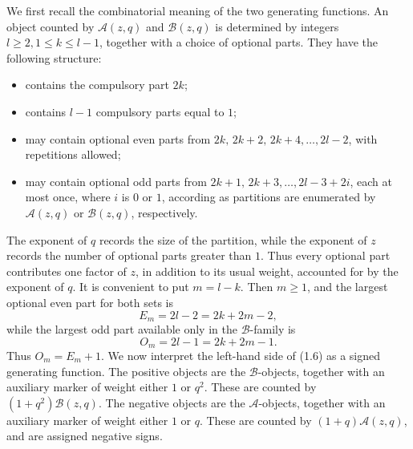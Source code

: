 \documentclass[10pt,a4paper]{amsart}
\numberwithin{equation}{section}
\begin{document}
We first recall the combinatorial meaning of the two generating functions.
An object counted by \(\mathcal A(z,q)\) and $\mathcal B(z,q)$ is determined by integers $l\ge2, 1\le k\le l-1$, together with a choice of optional parts. They have the following structure:
\begin{itemize}
    \item contains the compulsory part \(2k\);
    \item contains \(l-1\) compulsory parts equal to \(1\);
    \item may contain optional even parts from $2k,\,2k+2,\,2k+4,\ldots,2l-2$, with repetitions allowed;
    \item may contain optional odd parts from $2k+1,\,2k+3,\ldots,2l-3+2i$, each at most once, where $i$ is $0$ or $1$, according as partitions are enumerated by $\mathcal{A}(z,q)$ or $\mathcal{B}(z,q)$, respectively.
\end{itemize} 
The exponent of \(q\) records the size of the partition, while the exponent
of \(z\) records the number of optional parts greater than \(1\).  Thus every
optional part contributes one factor of \(z\), in addition to its usual weight, accounted for by the exponent of $q$. It is convenient to put $m=l-k$. Then \(m\ge1\), and the largest optional even part for both sets is
\[
E_m=2l-2=2k+2m-2,
\]
while the largest odd part available only in the \(\mathcal{B}\)-family is
\[
O_m=2l-1=2k+2m-1.
\]
Thus \(O_m=E_m+1\). We now interpret the left-hand side of (1.6) as a signed generating function.  The positive objects are the \(\mathcal B\)-objects,
together with an auxiliary marker of weight either \(1\) or \(q^2\). These
are counted by $(1+q^2)\mathcal B(z,q)$. The negative objects are the \(\mathcal A\)-objects, together with an auxiliary marker
of weight either \(1\) or \(q\). These are counted by $(1+q)\mathcal A(z,q)$, and are assigned negative signs.
\end{document}
